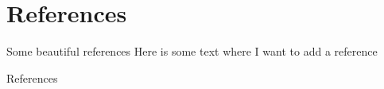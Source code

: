 \documentclass[aspectratio=169]{beamer}
\begin{document}
\section{References}

\begin{frame}{Some beautiful references}
	Here is some text where I want to add a reference \cite{Dittrich19}
\end{frame}

\begin{frame}{References}
    
    
\end{frame}
\end{document}
